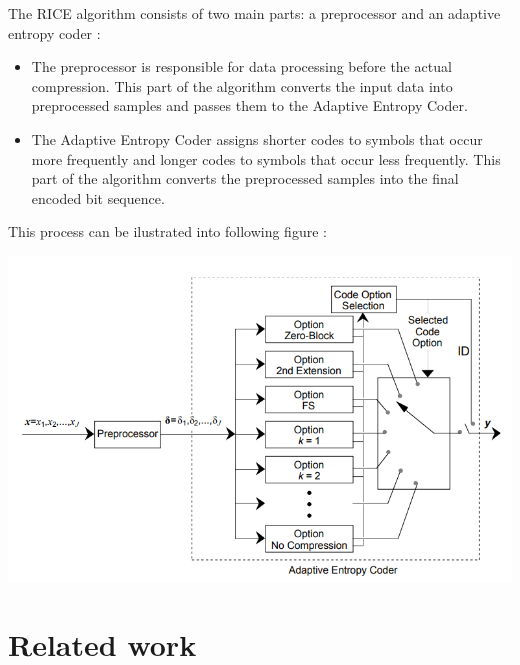 \documentclass[licencjacka,en]{pracamgr}
\begin{document}
The RICE algorithm consists of two main parts: a preprocessor and an adaptive entropy coder \cite{rice-basics}:
\begin{itemize}
\item The preprocessor is responsible for data processing before the actual compression. This part of the algorithm converts the input data into preprocessed samples and passes them to the Adaptive Entropy Coder.
\item The Adaptive Entropy Coder assigns shorter codes to symbols that occur more frequently and longer codes to symbols that occur less frequently. This part of the algorithm converts the preprocessed samples into the final encoded bit sequence.
\end{itemize}

\hfill \break
\hfill \break
\hfill \break
\hfill \break
This process can be ilustrated into following figure \cite{rice-basics}:
\hfill \break
\hfill \break
\centerline{\includegraphics[scale=1.05]{RICE_encoder_architecture}}




\chapter{Related work\label{r:related}}
\end{document}
